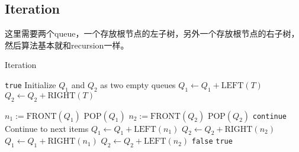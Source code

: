 \subsection{Iteration}
这里需要两个queue，一个存放根节点的左子树，另外一个存放根节点的右子树，然后算法基本就和recursion一样。
\begin{algorithm}[H]
\caption{Iteration}
\begin{algorithmic}[1]
\State \Return \texttt{true}
\EndIf
\State Initialize $Q_1$ and $Q_2$ as two empty queues
\State $Q_1\gets Q_1 + \text{LEFT}(T)$
\State $Q_2\gets Q_2 + \text{RIGHT}(T)$
\end{algorithmic}
\end{algorithm}
\begin{algorithm}[H]
\begin{algorithmic}[1]
\State $n_1:=\text{FRONT}(Q_1)$
\State $\text{POP}(Q_1)$
\State $n_2:=\text{FRONT}(Q_2)$
\State $\text{POP}(Q_2)$
\State \texttt{continue} \Comment Continue to next items
\EndIf
{}
\State $Q_1\gets Q_1 + \text{LEFT}(n_1)$
\State $Q_2\gets Q_2 + \text{RIGHT}(n_2)$
\State $Q_1\gets Q_1 + \text{RIGHT}(n_1)$
\State $Q_2\gets Q_2 + \text{LEFT}(n_2)$
\Else
\State \Return \texttt{false}
\EndIf
\EndWhile
\State \Return \texttt{true}
\EndProcedure
\end{algorithmic}
\end{algorithm}